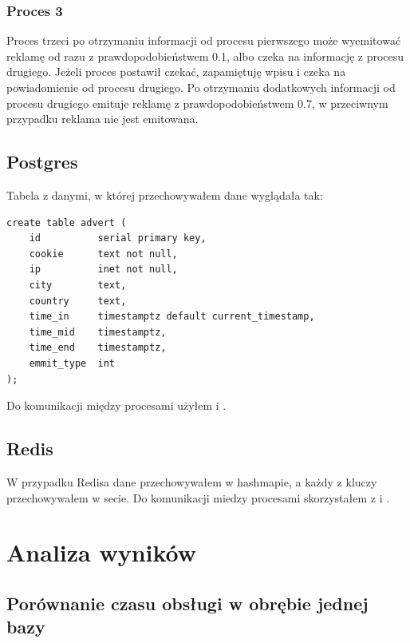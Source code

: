 \documentclass[polish, 10pt]{article}
\begin{document}
\subsubsection{Proces 3}
Proces trzeci po otrzymaniu informacji od procesu pierwszego może wyemitować reklamę od razu z prawdopodobieństwem 0.1, albo czeka na informację z procesu drugiego. Jeżeli proces postawił czekać, zapamiętuję  wpisu i czeka na powiadomienie od procesu drugiego. Po otrzymaniu dodatkowych informacji od procesu drugiego emituje reklamę z prawdopodobieństwem 0.7, w przeciwnym przypadku reklama nie jest emitowana.

\subsection{Postgres}

Tabela z danymi, w której przechowywałem dane wyglądała tak:
\begin{commandline}
\begin{verbatim}
create table advert (
    id          serial primary key,
    cookie      text not null,
    ip          inet not null,
    city        text,
    country     text,
    time_in     timestamptz default current_timestamp,
    time_mid    timestamptz,
    time_end    timestamptz,
    emmit_type  int
);
\end{verbatim}
\end{commandline}

Do komunikacji między procesami użyłem  i .

\subsection{Redis}
W przypadku Redisa dane przechowywałem w hashmapie, a każdy z kluczy przechowywałem w secie. Do komunikacji miedzy procesami skorzystałem z  i .

\section{Analiza wyników}

\subsection{Porównanie czasu obsługi w obrębie jednej bazy}

\end{document}
